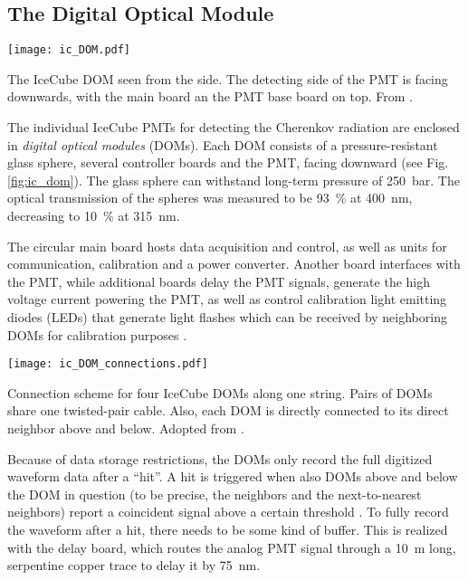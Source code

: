 \subsection{The Digital Optical Module} \label{DOM}
\begin{marginfigure}
    \texttt{[image: ic\_DOM.pdf]}
    \caption[IceCube digital optical module]{The IceCube DOM seen from the side. The detecting side of the PMT is facing downwards, with the main board an the PMT base board on top. From \cite{Aartsen2017}.}
\end{marginfigure}
The individual IceCube PMTs for detecting the Cherenkov radiation are enclosed in \textit{digital optical modules} (DOMs). Each DOM consists of a pressure-resistant glass sphere, several controller boards and the PMT, facing downward (see Fig. \ref{fig:ic_dom}). The glass sphere can withstand long-term pressure of \SI{250}{\bar}. The optical transmission of the spheres was measured to be \SI{93}{\percent} at \SI{400}{\nm}, decreasing to \SI{10}{\percent} at \SI{315}{\nm}.

The circular main board hosts data acquisition and control, as well as units for communication, calibration and a power converter. Another board interfaces with the PMT, while additional boards delay the PMT signals, generate the high voltage current powering the PMT, as well as control calibration light emitting diodes (LEDs) that generate light flashes which can be received by neighboring DOMs for calibration purposes .
\begin{marginfigure}
    \texttt{[image: ic\_DOM\_connections.pdf]}
    \caption[IceCube DOM connections]{Connection scheme for four IceCube DOMs along one string. Pairs of DOMs share one twisted-pair cable. Also, each DOM is directly connected to its direct neighbor above and below. Adopted from \cite{Aartsen2017}.} 
\end{marginfigure}
Because of data storage restrictions, the DOMs only record the full digitized waveform data after a ``hit''. A hit is triggered when also DOMs above and below the DOM in question (to be precise, the neighbors and the next-to-nearest neighbors) report a coincident signal above a certain threshold \cite{Aartsen2017}. To fully record the waveform after a hit, there needs to be some kind of buffer. This is realized with the delay board, which routes the analog PMT signal through a \SI{10}{\m} long, serpentine copper trace to delay it by \SI{75}{\nm}.

